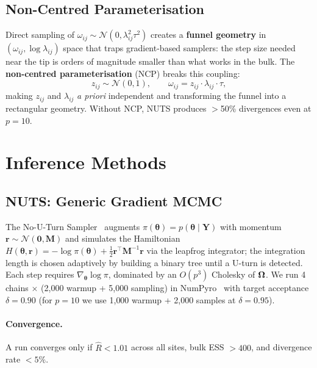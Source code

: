 \documentclass[10pt,conference,compsoc]{IEEEtran}
\newcommand{\Normal}{\mathcal{N}} \newcommand{\HalfCauchy}{\mathrm{C}^{+}} \newcommand{\InvGamma}{\mathrm{IG}}
\begin{document}
\subsection{Non-Centred Parameterisation}

Direct sampling of $\omega_{ij} \sim \Normal(0, \lambda_{ij}^2\tau^2)$ creates a \textbf{funnel geometry} in $(\omega_{ij}, \log\lambda_{ij})$ space that traps gradient-based samplers: the step size needed near the tip is orders of magnitude smaller than what works in the bulk. The \textbf{non-centred parameterisation} (NCP) breaks this coupling:
\begin{equation}
  z_{ij} \sim \Normal(0, 1), \qquad \omega_{ij} = z_{ij} \cdot \lambda_{ij} \cdot \tau,
  \label{eq:ncp}
\end{equation}
making $z_{ij}$ and $\lambda_{ij}$ \emph{a priori} independent and transforming the funnel into a rectangular geometry. Without NCP, NUTS produces $>$50\% divergences even at $p=10$.

\section{Inference Methods}

\subsection{NUTS: Generic Gradient MCMC}

The No-U-Turn Sampler~\cite{hoffman2014} augments $\pi(\bm{\theta}) = p(\bm{\theta}\mid\bm{Y})$ with momentum $\bm{r}\sim\Normal(\bm{0},\bm{M})$ and simulates the Hamiltonian $H(\bm{\theta},\bm{r}) = -\log\pi(\bm{\theta}) + \tfrac12\bm{r}^\top\bm{M}^{-1}\bm{r}$ via the leapfrog integrator; the integration length is chosen adaptively by building a binary tree until a U-turn is detected. Each step requires $\nabla_{\bm{\theta}}\log\pi$, dominated by an $O(p^3)$ Cholesky of $\bm{\Omega}$. We run 4 chains $\times$ (2{,}000 warmup + 5{,}000 sampling) in NumPyro~\cite{phan2019} with target acceptance $\delta = 0.90$ (for $p=10$ we use 1{,}000 warmup + 2{,}000 samples at $\delta=0.95$).

\paragraph{Convergence.} A run converges only if $\hat{R} < 1.01$ across all sites, bulk ESS $> 400$, and divergence rate $<5\%$.
\end{document}

